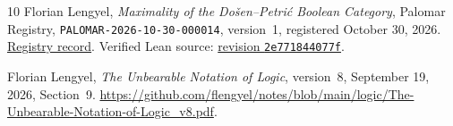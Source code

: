 \documentclass[11pt]{article}
\begin{document}
\begin{thebibliography}{10}
Florian Lengyel,
\emph{Maximality of the Do\v{s}en--Petri\'c Boolean Category},
Palomar Registry, \texttt{PALOMAR-2026-10-30-000014}, version~1,
registered October 30, 2026.
\href{https://palomar-registry.org/entry.html?id=PALOMAR-2026-10-30-000014&version=1}{Registry record}.
Verified Lean source:
\href{https://github.com/flengyel/Dosen-Petric-Maximality/tree/2e771844077fd8cebfbe365230f13d4dd13a75b1}{revision \texttt{2e771844077f}}.

Florian Lengyel,
\emph{The Unbearable Notation of Logic},
version~8, September 19, 2026, Section~9.
\url{https://github.com/flengyel/notes/blob/main/logic/The-Unbearable-Notation-of-Logic_v8.pdf}.
\end{thebibliography}
\end{document}
